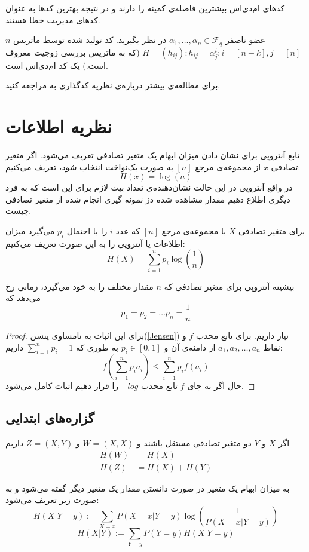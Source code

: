 کدهای ام‌دی‌اس بیشترین فاصله‌ی کمینه را دارند و در نتیجه بهترین کدها به عنوان کدهای مدیریت خطا هستند.
\begin{example}
	$n$
	عضو ناصفر
	$\alpha_1, \ldots, \alpha_n \in \mathcal{F}_q$
	در نظر بگیرید. کد تولید شده توسط ماتریس 
	$H = (h_{ij}): h_{ij} = \alpha_j^i: i = [n - k], j = [n]$
	(که به ماتریس بررسی زوجیت معروف است.) یک کد ام‌دی‌اس است.
\end{example}

	برای مطالعه‌ی بیشتر درباره‌ی نظریه کدگذاری به
\cite{book:coding}
مراجعه کنید.
\section{نظریه اطلاعات}
تابع آنتروپی برای نشان دادن میزان ابهام یک متغیر تصادفی تعریف می‌شود. اگر متغیر تصادفی
$x$
از مجموعه‌ی مرجع
$[n]$
به صورت یک‌نواخت انتخاب شود، تعریف می‌کنیم:
$$H(x) = \log(n)$$
در واقع آنتروپی در این حالت نشان‌دهنده‌ی تعداد بیت لازم برای این است که به فرد دیگری اطلاع دهیم مقدار مشاهده شده دز نمونه گیری انجام شده از متغیر تصادفی چیست. 


\begin{definition}[آنتروپی]
برای متغیر تصادفی
$X$
با مجموعه‌ی مرجع
$[n]$
که عدد
$i$
را با احتمال
$p_i$
می‌گیرد میزان اطلاعات یا آنتروپی را به این صورت تعریف می‌کنیم:
$$H(X) = \sum_{i = 1}^{n} p_i \log(\frac{1}{n})$$
\end{definition}
\begin{theorem}
بیشینه آنتروپی برای متغیر تصادفی که
$n$
مقدار مختلف را به خود می‌گیرد، زمانی رخ می‌دهد که
$$p_1 = p_2 = \dots p_n = \frac{1}{n}$$
\end{theorem}
\begin{proof}
برای این اثبات به نامساوی ینسن(\autoref{Jensen})
 نیاز داریم. برای تابع محدب
$f$
و نقاط
$a_1, a_2, \dots, a_n$
از دامنه‌ی آن و
$p_i \in [0, 1]$
به طوری که
$\sum_{i = 1}^{n} p_i = 1$
داریم:
$$f(\sum_{i = 1}^{n} p_i a_i) \leq \sum_{i = 1}^{n} p_i f(a_i)$$
حال اگر به جای
$f$
تابع محدب
$- log$
را قرار دهیم اثبات کامل می‌شود.
\end{proof}

\subsection{گزاره‌های ابتدایی}
\begin{theorem}
اگر
$X$
و
$Y$
دو متغیر تصادفی مستقل باشند و
$W = (X, X)$
و
$Z = (X, Y)$
داریم
\begin{align*}
    H(W) &= H(X) \\
    H(Z) &= H(X) + H(Y)
\end{align*}
\end{theorem}
\begin{definition}
	به میزان ابهام یک متغیر در صورت دانستن مقدار یک متغیر دیگر گفته می‌شود و به صورت زیر تعریف می‌شود:
$$H(X | Y = y) := \sum_{X = x} P(X = x| Y = y) \log(\frac{1}{P(X = x| Y = y)})$$
$$H(X|Y) := \sum_{Y = y} P(Y = y) H(X | Y = y)$$
\end{definition}


